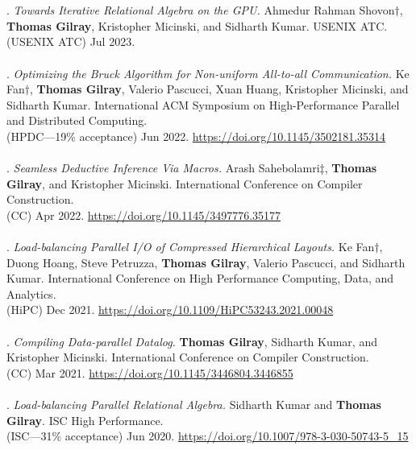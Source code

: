 \\ \vspace{-0.1cm}\\
\paper. \textit{Towards Iterative Relational Algebra on the GPU.}
Ahmedur Rahman Shovon$\dagger$, \textbf{Thomas Gilray}, Kristopher Micinski, and Sidharth Kumar.
USENIX ATC.
\\(USENIX ATC) Jul 2023.
\\ \vspace{-0.1cm}\\
\paper. \textit{Optimizing the Bruck Algorithm for Non-uniform All-to-all Communication.}
Ke Fan$\dagger$, \textbf{Thomas Gilray}, Valerio Pascucci, Xuan Huang, Kristopher Micinski, and Sidharth Kumar.
International ACM Symposium on High-Performance Parallel and Distributed Computing.
\\(HPDC---19\% acceptance) Jun 2022. \url{https://doi.org/10.1145/3502181.35314}
\\ \vspace{-0.1cm}\\
\paper. \textit{Seamless Deductive Inference Via Macros.}
Arash Sahebolamri$\ddagger$, \textbf{Thomas Gilray}, and Kristopher Micinski.
International Conference on Compiler Construction.
\\(CC) Apr 2022. \url{https://doi.org/10.1145/3497776.35177}
\\ \vspace{-0.1cm}\\
\paper. \textit{Load-balancing Parallel I/O of Compressed Hierarchical Layouts.}
Ke Fan$\dagger$, Duong Hoang, Steve Petruzza, \textbf{Thomas Gilray}, Valerio Pascucci, and Sidharth Kumar.
International Conference on High Performance Computing, Data, and Analytics.
\\(HiPC) Dec 2021. \url{https://doi.org/10.1109/HiPC53243.2021.00048}
\\ \vspace{-0.1cm}\\
\paper. \textit{Compiling Data-parallel Datalog.}
\textbf{Thomas Gilray}, Sidharth Kumar, and Kristopher Micinski.
International Conference on Compiler Construction.
\\(CC) Mar 2021. \url{https://doi.org/10.1145/3446804.3446855}
\\ \vspace{-0.1cm}\\
\paper. \textit{Load-balancing Parallel Relational Algebra.}
Sidharth Kumar and \textbf{Thomas Gilray}.
ISC High Performance.
\\(ISC---31\% acceptance) Jun 2020. \url{https://doi.org/10.1007/978-3-030-50743-5_15}
